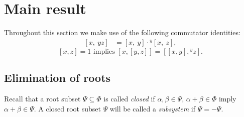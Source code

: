 \documentclass{article}
\numberwithin{equation}{section}
\theoremstyle{definition}
\theoremstyle{remark}
\newcommand{\up}[2]{{^{#1}\!{#2}}}
\begin{document}
\section{Main result}
Throughout this section we make use of the following commutator identities:
\begin{align}
\label{eq:comm-mult-rhs}[x,\ yz]& =   [x,\ y] \cdot {}^{y}\![x,\ z],
\end{align}
\begin{equation} \label{eq:HW-corr} [x,z] = 1 \text{ implies } [x, [y,z]] = [[x,y],{}^yz].
\end{equation}

\subsection{Elimination of roots}
Recall that a root subset $\Psi \subseteq \Phi$ is called {\it closed} if $\alpha, \beta \in \Psi$, $\alpha+\beta\in\Phi$ imply $\alpha+\beta\in \Psi$. A closed root subset $\Psi$ will be called a {\it subsystem} if $\Psi = -\Psi$.
\end{document}
